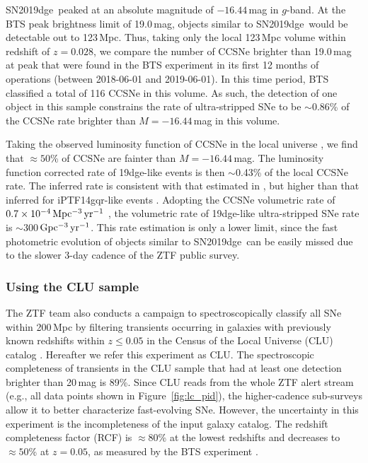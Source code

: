 \documentclass[twocolumn]{aastex63}
\newcommand{\name}{SN2019dge}
\begin{document}
\begin{CJK*}{UTF8}{gbsn}
\name\ peaked at an absolute magnitude of $-16.44$\,mag in $g$-band.
At the BTS peak brightness limit of 19.0\,mag, objects similar to \name\ would be detectable 
out to 123\,Mpc. Thus, taking only the local 123\,Mpc volume within redshift of $z = 0.028$, we 
compare the number of CCSNe brighter than 19.0\,mag at peak that were found in the BTS experiment 
in its first 12 months of operations (between 2018-06-01 and 2019-06-01). In this time period, BTS 
classified a total of 116 CCSNe in this volume. As such, the detection of one object in this sample 
constrains the rate of ultra-stripped SNe to be $\sim$0.86\% of the CCSNe rate brighter than $M = 
-16.44$\,mag in this volume. 

Taking the observed luminosity function of CCSNe in the local universe \citep{Li2011b}, we find that 
$\approx 50$\% of CCSNe are fainter than $M = -16.44$\,mag. The 
luminosity function corrected rate of 19dge-like events is then $\sim$0.43\% of the local CCSNe rate. 
The inferred rate is consistent with that estimated in 
\citet{Tauris2015}, but higher than that inferred for iPTF14gqr-like events \citep{Hijikawa2019}. 
Adopting the CCSNe volumetric rate of $0.7 \times 10^{-4}\,{\rm Mpc^{-3}\, yr^{-1}}$
\citep{Li2011a}, the volumetric rate of 19dge-like ultra-stripped SNe rate is $\sim$300\,${\rm Gpc^{-3}\, 
yr^{-1}}$. This rate estimation is only a lower limit, since the fast photometric evolution of objects 
similar to \name\ can be easily missed due to the slower 3-day cadence of the ZTF public survey.

\subsubsection{Using the CLU sample}
The ZTF team also conducts a campaign to spectroscopically 
classify all SNe within 200\,Mpc  by filtering transients occurring in galaxies with 
previously known redshifts within $z\leq0.05$ in the Census of the Local Universe (CLU) catalog 
\citep{De2020b}. Hereafter we refer this experiment as CLU. The spectroscopic completeness of 
transients in the CLU sample that had at least one detection brighter 
than 20\,mag is 89\%. Since CLU reads from the whole ZTF alert stream (e.g., all data points shown in 
Figure~\ref{fig:lc_pid}), the higher-cadence sub-surveys allow it to better characterize fast-evolving 
SNe. However, the uncertainty in this experiment is the incompleteness of the input galaxy catalog. 
The redshift completeness factor (RCF) is $\approx80$\% at the lowest redshifts and decreases to 
$\approx50$\% at $z=0.05$, as measured by the BTS experiment \citep{FremlingBTS2019}.


\end{CJK*}
\end{document}
